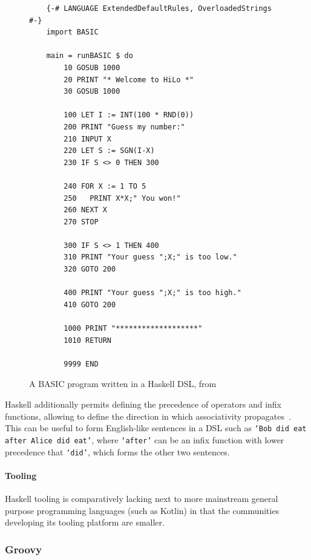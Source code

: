 \begin{figure}[h]
    \centering
    \begin{minipage}{0.8\textwidth}
        \begin{verbatim}
    {-# LANGUAGE ExtendedDefaultRules, OverloadedStrings #-}
    import BASIC

    main = runBASIC $ do
        10 GOSUB 1000
        20 PRINT "* Welcome to HiLo *"
        30 GOSUB 1000

        100 LET I := INT(100 * RND(0))
        200 PRINT "Guess my number:"
        210 INPUT X
        220 LET S := SGN(I-X)
        230 IF S <> 0 THEN 300

        240 FOR X := 1 TO 5
        250   PRINT X*X;" You won!"
        260 NEXT X
        270 STOP

        300 IF S <> 1 THEN 400
        310 PRINT "Your guess ";X;" is too low."
        320 GOTO 200

        400 PRINT "Your guess ";X;" is too high."
        410 GOTO 200

        1000 PRINT "*******************"
        1010 RETURN

        9999 END
        \end{verbatim}
    \end{minipage}
    \caption[BASIC program written in a Haskell DSL]
    {A BASIC program written in a Haskell DSL, from~\cite{haskellBasicDSL}}
    \label{fig:haskellBasicDsl}
\end{figure}

Haskell additionally permits defining the precedence of operators and infix functions, allowing to define the direction in which associativity propagates~\cite{haskellFixity}.
This can be useful to form English-like sentences in a DSL such as \texttt{`Bob did eat after Alice did eat'}, where \texttt{`after'} can be an infix function with lower precedence that \texttt{`did'}, which forms the other two sentences.

\paragraph{Tooling} Haskell tooling is comparatively lacking next to more mainstream general purpose programming languages (such as Kotlin) in that the communities developing its tooling platform are smaller.

\subsubsection{Groovy}

